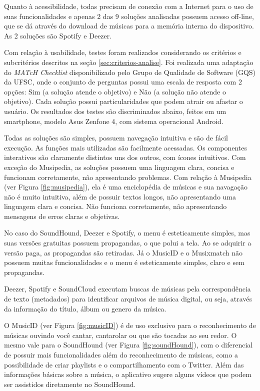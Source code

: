Quanto à acessibilidade, todas precisam de conexão com a Internet para o uso de suas funcionalidades e apenas 2 das 9 soluções analisadas possuem acesso off-line, que se dá através do download de músicas para a memória interna do dispositivo. As 2 soluções são Spotify e Deezer.

Com relação à usabilidade, testes foram realizados considerando os critérios e subcritérios descritos na seção \ref{sec:criterios-analise}. Foi realizada uma adaptação do \textit{MATcH Checklist} disponibilizado pelo Grupo de Qualidade de Software (GQS) da UFSC, onde o conjunto de perguntas possui uma escala de resposta com 2 opções: Sim (a solução atende o objetivo) e Não (a solução não atende o objetivo). Cada solução possui particularidades que podem atrair ou afastar o usuário. Os resultados dos testes são discriminados abaixo, feitos em um smartphone, modelo Asus Zenfone 4, com sistema operacional Android.

Todas as soluções são simples, possuem navegação intuitiva e são de fácil execução. As funções mais utilizadas são facilmente acessadas. Os componentes interativos são claramente distintos uns dos outros, com ícones intuitivos. Com exceção do Musipedia, as soluções possuem uma linguagem clara, concisa e funcionam corretamente, não apresentando problemas. Com relação à Musipedia (ver Figura \ref{fig:musipedia}), ela é uma enciclopédia de músicas e sua navagação não é muito intuitiva, além de possuir textos longos, não apresentando uma linguagem clara e concisa. Não funciona corretamente, não apresentando mensagens de erros claras e objetivas.

No caso do SoundHound, Deezer e Spotify, o menu é esteticamente simples, mas suas versões gratuitas possuem propagandas, o que polui a tela. Ao se adquirir a versão paga, as propagandas são retiradas. Já o MusicID e o Musixmatch não possuem muitas funcionalidades e o menu é esteticamente simples, claro e sem propagandas.

Deezer, Spotify e SoundCloud executam buscas de músicas pela correspondência de texto (metadados) para identificar arquivos de música digital, ou seja, através da informação do título, álbum ou genero da música.

O MusicID (ver Figura \ref{fig:musicID}) é de uso exclusivo para o reconhecimento de músicas ouvindo você cantar, cantarolar ou que são tocadas ao seu redor. O mesmo vale para o SoundHound (ver Figura \ref{fig:soundHound}), com o diferencial de possuir mais funcionalidades além do reconhecimento de músicas, como a possibilidade de criar playlists e o compartilhamento com o Twitter. Além das informações básicas sobre a música, o aplicativo sugere alguns vídeos que podem ser assistidos diretamente no SoundHound.

